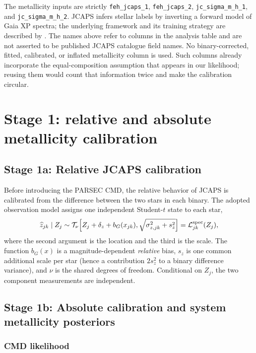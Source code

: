 The metallicity inputs are strictly
\nolinkurl{feh_jcaps_1}, \nolinkurl{feh_jcaps_2},
\nolinkurl{jc_sigma_m_h_1}, and \nolinkurl{jc_sigma_m_h_2}.
JCAPS infers stellar labels by inverting a forward model of Gaia XP spectra;
the underlying framework and its training strategy are described by
\citet{Li2026JCaPS}.  The names above refer to columns in the analysis table and
are not asserted to be published JCAPS catalogue field names.
No binary-corrected, fitted, calibrated, or inflated metallicity column is used.
Such columns already incorporate the equal-composition assumption that appears
in our likelihood; reusing them would count that information twice and make the
calibration circular.

\section{Stage 1: relative and absolute metallicity calibration}
\label{sec:stage1}

\subsection{Stage 1a: Relative JCAPS calibration}

Before introducing the PARSEC CMD, the relative behavior of JCAPS is calibrated
from the difference between the two stars in each binary.  The adopted
observation model assigns one independent Student-$t$ state to each star,
\begin{equation}
 \widehat z_{jk}\mid Z_j
 \sim \mathcal{T}_{\nu}\!\left[
 Z_j+\delta_z+b_G(x_{jk}),
 \sqrt{\sigma_{z,jk}^2+s_z^2}\right] = \mathcal{L}^{\mathrm{spec}}_{jk}(Z_j),
 \label{eq:spec-model}
\end{equation}
where the second argument is the location and the third is the scale.  The
function $b_G(x)$ is a magnitude-dependent \emph{relative} bias, $s_z$ is one
common additional scale per star (hence a contribution $2s_z^2$ to a binary
difference variance), and $\nu$ is the shared degrees of freedom.  Conditional
on $Z_j$, the two component measurements are independent.


\subsection{Stage 1b: Absolute calibration and system metallicity posteriors}

\subsubsection{CMD likelihood}

